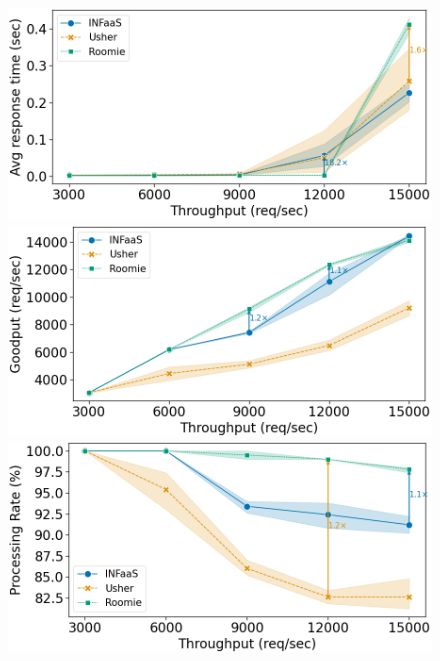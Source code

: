 \begin{figure}
	\begin{minipage}[t]{.24\textwidth}
		\centering
		\includegraphics[width=\linewidth]{chapters/roomie/images/NvidiaA100/twitter-all-models/response_time_line.png}
	\end{minipage}
	\hfill
	\begin{minipage}[t]{.24\textwidth}
		\centering
		\includegraphics[width=\textwidth]{chapters/roomie/images/NvidiaA100/twitter-all-models/goodput_line.png}
	\end{minipage}
	\hfill
	\begin{minipage}[t]{.24\textwidth}
		\centering
		\includegraphics[width=\linewidth]{chapters/roomie/images/NvidiaA100/twitter-all-models/normalized_line.png}

\end{minipage}
\end{figure}
